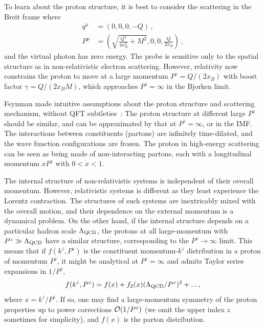 To learn about the proton structure, it is best to consider
the scattering in the Breit frame where
\begin{align}\label{eq:diskin}
	q^\mu &= (0,0,0,-Q)  \,, \nonumber \\
	P^\mu &=\left(\sqrt{\frac{Q^2}{4x_B^2}+M^2}, 0, 0, \frac{Q}{2x_B}\right) \,,
\end{align}
and the virtual photon has zero energy. The probe is sensitive only to
the spatial structure as in non-relativistic electron scattering.
However, relativity now constrains the proton to move at a large
momentum $P^z= Q/(2x_B)$ with boost factor $\gamma = Q/(2x_BM)$,
which approaches $P^z=\infty$ in the Bjorken limit.

Feynman made intuitive assumptions about
the proton structure and scattering mechanism, without QFT subtleties~\cite{Feynman:1973xc}:
The proton structure at different large $P^z$ should be similar, and can be
approximated by that at $P^z=\infty$, or in the IMF. The interactions between
constituents (partons) are infinitely time-dilated, and
the wave function configurations are frozen. The proton in high-energy scattering
can be seen as being made of non-interacting partons, each with a longitudinal
momentum $xP^z$ with $0< x< 1$.

The internal structure of non-relativistic
systems is independent of their overall momentum. However, relativistic systems
is different as they least experience the Lorentz contraction.
The structures of such systems are inextricably mixed with
the overall motion, and their dependence on the external momentum is a
dynamical problem. On the other hand, if the internal structure
depends on a particular hadron scale $\Lambda_{\rm QCD}$, the protons at all large-momentum
with $P^z\gg \Lambda_{\rm QCD}$ have a similar structure, corresponding to the
$P^z\to \infty$ limit. This means that if $f(k^z,P^z)$
is the constituent momentum-$k^z$ distribution in a proton of momentum $P^z$,
it might be analytical at $P^z=\infty$ and admits Taylor series expansions
in $1/P^z$,
\begin{align}\label{Eq:expansion}
	f(k^z, P^z) = f(x) + f_2(x)(\Lambda_{\rm QCD}/P^z)^2 + ...\,,
\end{align}
where $x=k^z/P^z$. If so, one may find a large-momentum symmetry of
the proton properties up to power corrections ${\cal O}(1/P^z)$ (we omit the upper index $z$ sometimes
for simplicity), and $f(x)$ is the parton distribution.


